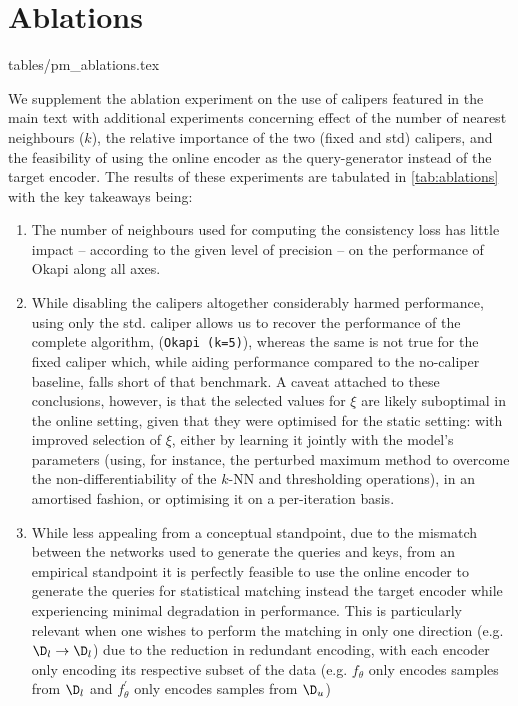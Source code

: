 \section{Ablations}\label{appx:ablations}

{tables/pm_ablations.tex}

 We supplement the ablation experiment on the use of calipers featured in the main text with
 additional experiments concerning effect of the number of nearest neighbours ($k$), the relative
 importance of the two (fixed and std) calipers, and the feasibility of using the online encoder as
 the query-generator instead of the target encoder.
 The results of these experiments are tabulated in \ref{tab:ablations} with the key takeaways
 being: \begin{enumerate} 
     \item The number of neighbours used for computing the consistency loss
         has little impact -- according to the given level of precision -- on the performance of Okapi
        along all axes.
     \item While disabling the calipers altogether considerably harmed performance, using only the
         std. caliper allows us to recover the performance of the complete algorithm,
         (\texttt{Okapi (k=5)}), whereas the same is not true for the fixed caliper which, while
         aiding performance compared to the no-caliper baseline, falls short of that benchmark.
         A caveat attached to these conclusions, however, is that the selected values for $\xi$ are
         likely suboptimal in the online setting, given that they were optimised for the static
         setting: with improved selection of $\xi$, either by learning it jointly with the model's
         parameters (using, for instance, the perturbed maximum method \citep{berthet2020learning}
         to overcome the non-differentiability of the $k$-NN and thresholding operations), in an
         amortised
     fashion, or optimising it on a per-iteration basis.
    \item While less appealing from a conceptual standpoint, due to the mismatch between the
        networks used to generate the queries and keys, from an empirical standpoint it is
        perfectly feasible to use the online encoder to generate the queries for statistical
        matching instead the target encoder while experiencing minimal degradation in performance.
     This is particularly relevant when one wishes to perform the matching in only one direction
(e.g. $\D_l \rightarrow \D_l$) due to the reduction in redundant encoding, with each encoder only
encoding its respective subset of the data (e.g. $f_\theta$ only encodes samples from $\D_l$ and
$f_\theta^\prime$ only encodes samples from $\D_u$) \end{enumerate}


